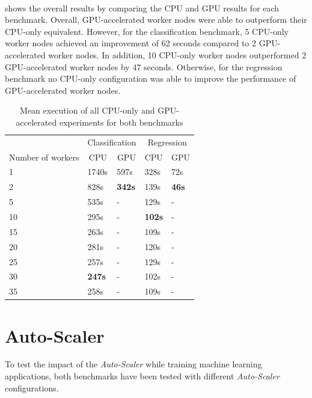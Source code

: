 \paragraph{}
 shows the overall results by comparing the CPU and GPU results for each benchmark.
Overall, GPU-accelerated worker nodes were able to outperform their CPU-only equivalent.
However, for the classification benchmark, 5 CPU-only worker nodes achieved an improvement of 62 seconds compared to 2 GPU-accelerated worker nodes. In addition, 10 CPU-only worker nodes outperformed 2 GPU-accelerated worker nodes by 47 seconds.
Otherwise, for the regression benchmark no CPU-only configuration was able to improve the performance of GPU-accelerated worker nodes.


\begin{table}[ht]
\centering
\begin{tabular}{@{}l|ll|ll@{}}
\toprule
                  & \multicolumn{2}{c|}{Classification}                & \multicolumn{2}{c}{Regression}                    \\
Number of workers & \multicolumn{1}{c}{CPU} & \multicolumn{1}{c|}{GPU} & \multicolumn{1}{c}{CPU} & \multicolumn{1}{c}{GPU} \\ \midrule
1  & 1740s & 597s & 328s & 72s \\
2  & 828s  & \textbf{342s} & 139s & \textbf{46s} \\
5  & 535s  & -      & 129s & -     \\
10 & 295s  & -      & \textbf{102s} & -     \\
15 & 263s  & -      & 109s & -     \\
20 & 281s  & -      & 120s & -     \\
25 & 257s  & -      & 129s & -     \\
30 & \textbf{247s}  & -      & 102s & -     \\
35 & 258s  & -      & 109s & -     \\ \bottomrule
\end{tabular}
\caption{Mean execution of all CPU-only and GPU-accelerated experiments for both benchmarks}
\label{table:07_gpu_overall_results}
\end{table}


\section{Auto-Scaler}
To test the impact of the \textit{Auto-Scaler} while training machine learning applications, both benchmarks have been tested with different \textit{Auto-Scaler} configurations. 



